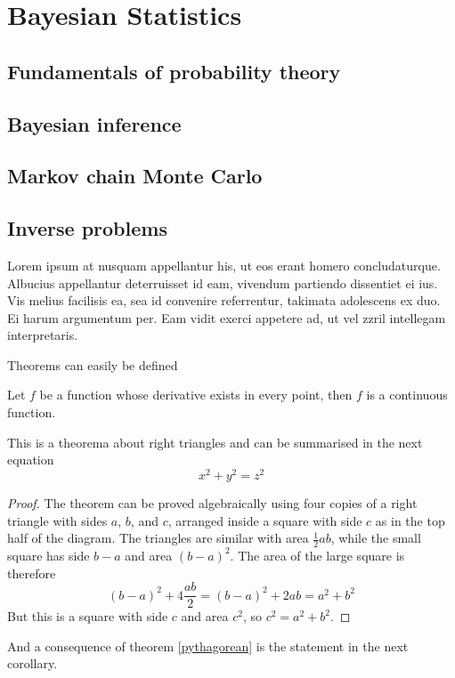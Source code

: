 
\chapter{Bayesian Statistics}\label{ch:stats}

\section{Fundamentals of probability theory}

\section{Bayesian inference}

\section{Markov chain Monte Carlo}

\section{Inverse problems}

Lorem ipsum at nusquam appellantur his, ut eos erant homero
concludaturque. Albucius appellantur deterruisset id eam, vivendum
partiendo dissentiet ei ius. Vis melius facilisis ea, sea id convenire
referrentur, takimata adolescens ex duo. Ei harum argumentum per. Eam
vidit exerci appetere ad, ut vel zzril intellegam interpretaris.

Theorems can easily be defined

\begin{definition}
  Let $f$ be a function whose derivative exists in every point, then $f$ is 
  a continuous function.
\end{definition}

\begin{theorem}
  \label{pythagorean}
  This is a theorema about right triangles and can be summarised in the next 
  equation 
  \[ x^2 + y^2 = z^2 \]
\end{theorem}

\begin{proof}
  The theorem can be proved algebraically using four copies of a right triangle with sides $a$, $b$, and $c$, arranged inside a square with side $c$ as in the top half of the diagram. The triangles are similar with area $\tfrac12ab$, while the small square has side $b-a$ and area $(b-a)^2$. The area of the large square is therefore
  $$(b-a)^2+4\frac{ab}{2} = (b-a)^2+2ab = a^2+b^2$$  
  But this is a square with side $c$ and area $c^2$, so $c^2 = a^2 + b^2$.
\end{proof}

And a consequence of theorem \ref{pythagorean} is the statement in the next 
corollary.